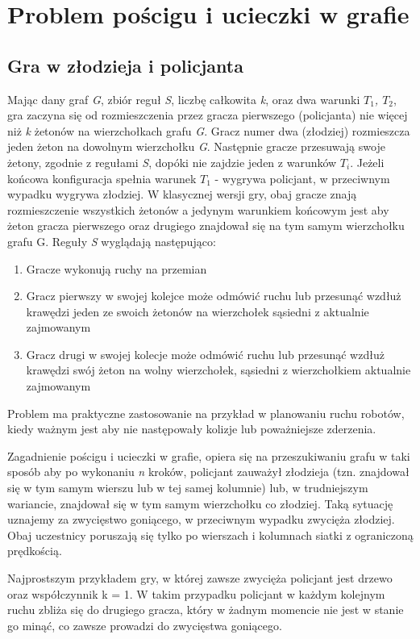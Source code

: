 \documentclass[brudnopis]{xmgr}
\begin{document}
\chapter{Problem pościgu i ucieczki w grafie}
\section{Gra w złodzieja i policjanta}
Mając dany graf \textit{G}, zbiór reguł \textit{S}, liczbę całkowita \textit{k}, oraz dwa warunki \textit{$T_1$, $T_2$}, gra zaczyna się od rozmieszczenia przez gracza pierwszego (policjanta) nie więcej niż \textit{k} żetonów na wierzchołkach grafu \textit{G}. Gracz numer dwa (złodziej) rozmieszcza jeden żeton na dowolnym wierzchołku \textit{G}. Następnie gracze przesuwają swoje żetony, zgodnie z regułami \textit{S}, dopóki nie zajdzie jeden z warunków $T_i$. Jeżeli końcowa konfiguracja spełnia warunek $T_1$ - wygrywa policjant, w przeciwnym wypadku wygrywa złodziej. W klasycznej wersji gry, obaj gracze znają rozmieszczenie wszystkich żetonów a jedynym warunkiem końcowym jest aby żeton gracza pierwszego oraz drugiego znajdował się na tym samym wierzchołku grafu G.
Reguły \textit{S} wyglądają następująco:
\begin{enumerate}
  \item Gracze wykonują ruchy na przemian
  \item Gracz pierwszy w swojej kolejce może odmówić ruchu lub przesunąć wzdłuż krawędzi jeden ze swoich żetonów na wierzchołek sąsiedni z aktualnie zajmowanym
  \item Gracz drugi w swojej kolecje może odmówić ruchu lub przesunąć wzdłuż krawędzi swój żeton na wolny wierzchołek, sąsiedni z wierzchołkiem aktualnie zajmowanym
\end{enumerate}

Problem ma praktyczne zastosowanie na przykład w planowaniu ruchu robotów, kiedy ważnym jest aby nie następowały kolizje lub poważniejsze zderzenia.

Zagadnienie pościgu i ucieczki w grafie, opiera się na przeszukiwaniu grafu w taki sposób aby po wykonaniu \textit{n} kroków, policjant zauważył złodzieja (tzn. znajdował się w tym samym wierszu lub w tej samej kolumnie) lub, w trudniejszym wariancie, znajdował się w tym samym wierzchołku co złodziej. Taką sytuację uznajemy za zwycięstwo goniącego, w przeciwnym wypadku zwycięża złodziej. Obaj uczestnicy poruszają się tylko po wierszach i kolumnach siatki z ograniczoną prędkością.

Najprostszym przykładem gry, w której zawsze zwycięża policjant jest drzewo oraz współczynnik k = 1. W takim przypadku policjant w każdym kolejnym ruchu zbliża się do drugiego gracza, który w żadnym momencie nie jest w stanie go minąć, co zawsze prowadzi do zwycięstwa goniącego.
\end{document}
